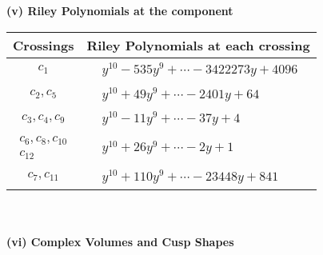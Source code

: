\documentclass[1p]{elsarticle_modified}
\theoremstyle{definition}
\begin{document}
\newpage\renewcommand{\arraystretch}{1}
\flushleft \textbf{(v) Riley Polynomials at the component}\newline \\
\begin{tabular}{m{50pt}|m{274pt}}
Crossings & \hspace{64pt}Riley Polynomials at each crossing \\
\hline $$\begin{aligned}c_{1}\end{aligned}$$&$\begin{aligned}
&y^{10}-535 y^9+\cdots-3422273 y+4096
\end{aligned}$\\
\hline $$\begin{aligned}c_{2},c_{5}\end{aligned}$$&$\begin{aligned}
&y^{10}+49 y^9+\cdots-2401 y+64
\end{aligned}$\\
\hline $$\begin{aligned}c_{3},c_{4},c_{9}\end{aligned}$$&$\begin{aligned}
&y^{10}-11 y^9+\cdots-37 y+4
\end{aligned}$\\
\hline $$\begin{aligned}c_{6},c_{8},c_{10}\\c_{12}\end{aligned}$$&$\begin{aligned}
&y^{10}+26 y^9+\cdots-2 y+1
\end{aligned}$\\
\hline $$\begin{aligned}c_{7},c_{11}\end{aligned}$$&$\begin{aligned}
&y^{10}+110 y^9+\cdots-23448 y+841
\end{aligned}$\\
\hline
\end{tabular}\\~\\
\newpage\flushleft \textbf{(vi) Complex Volumes and Cusp Shapes}
\end{document}
